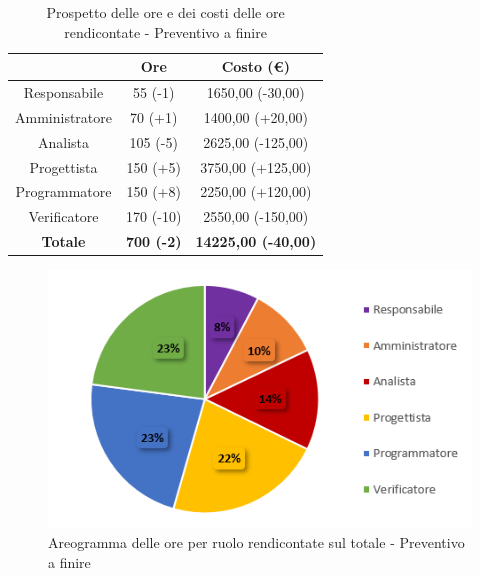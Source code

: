 \begin{table}[H]
  \centering
  \renewcommand{\arraystretch}{1.8}
  \begin{tabular}{c|c|c}
    \rowcolor[HTML]{125E28}
    \multicolumn{1}{c}{\color[HTML]{FFFFFF}\textbf{Ruolo}}
                    & \multicolumn{1}{c}{\color[HTML]{FFFFFF}\textbf{Ore}}
                    & \multicolumn{1}{c}{\color[HTML]{FFFFFF}\textbf{Costo (€)}}                              \\
    \hline
    Responsabile    & 55 (-1)                                                    & 1650,00 (-30,00)           \\
    Amministratore  & 70 (+1)                                                    & 1400,00 (+20,00)           \\
    Analista        & 105 (-5)                                                   & 2625,00 (-125,00)          \\
    Progettista     & 150 (+5)                                                   & 3750,00 (+125,00)          \\
    Programmatore   & 150 (+8)                                                   & 2250,00 (+120,00)          \\
    Verificatore    & 170 (-10)                                                  & 2550,00 (-150,00)          \\
    \textbf{Totale} & \textbf{700 (-2)}                                          & \textbf{14225,00 (-40,00)} \\
  \end{tabular}
  \caption{Prospetto delle ore e dei costi delle ore rendicontate - Preventivo a finire}
\end{table}

\begin{figure}[H]
  \centering
  \includegraphics[scale=0.9]{immagini/ore_ruolo_preventivo_finire.png}
  \caption{Areogramma delle ore per ruolo rendicontate sul totale - Preventivo a finire}
\end{figure}

